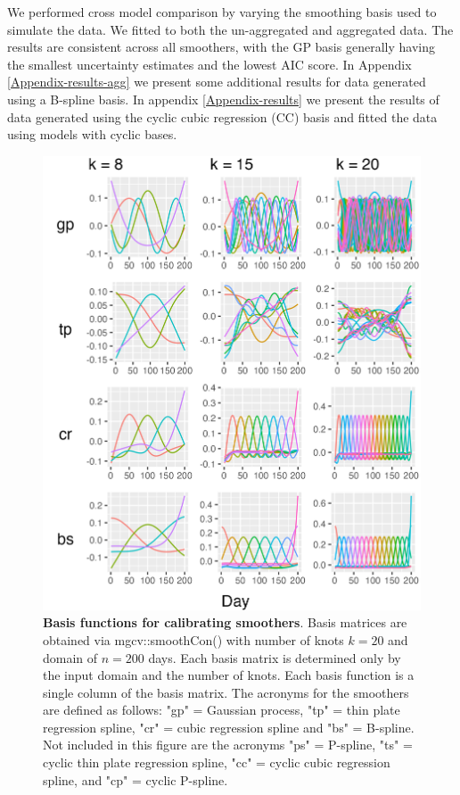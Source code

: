 \documentclass[
11pt, %
oneside, %
english, %
singlespacing, %
]{macthesis} %
\begin{document}
We performed cross model comparison by varying the smoothing basis used to simulate the data. We fitted to both the un-aggregated and aggregated data. The results are consistent across all smoothers, with the GP basis generally having the smallest uncertainty estimates and the lowest AIC score. In Appendix \ref{Appendix-results-agg} we present some additional results for data generated using a B-spline basis. In appendix \ref{Appendix-results} we present the results of data generated using the cyclic cubic regression (CC) basis and fitted the data using models with cyclic bases.

\begin{figure}[H]
\centering
\includegraphics[width=\textwidth]{figure/Simulated/unaggregated/simulation_gp_20_k(5,10,20)_bsd1_beta1_plot_basis.png}
\caption[Basis Functions for Smoothing Basis.]{\textbf{Basis functions for calibrating smoothers}. Basis matrices are obtained via mgcv::smoothCon() with number of knots \(k=20\) and domain of \(n=200\) days. Each basis matrix is determined only by the input domain and the number of knots. Each basis function is a single column of the basis matrix. The acronyms for the smoothers are defined as follows: "gp" = Gaussian process, "tp" = thin plate regression spline, "cr" = cubic regression spline and "bs" = B-spline. Not included in this figure are the acronyms "ps" = P-spline, "ts" = cyclic thin plate regression spline, "cc" = cyclic cubic regression spline, and "cp" = cyclic P-spline.}
\label{fig:basis20gp}
\end{figure}
\end{document}
